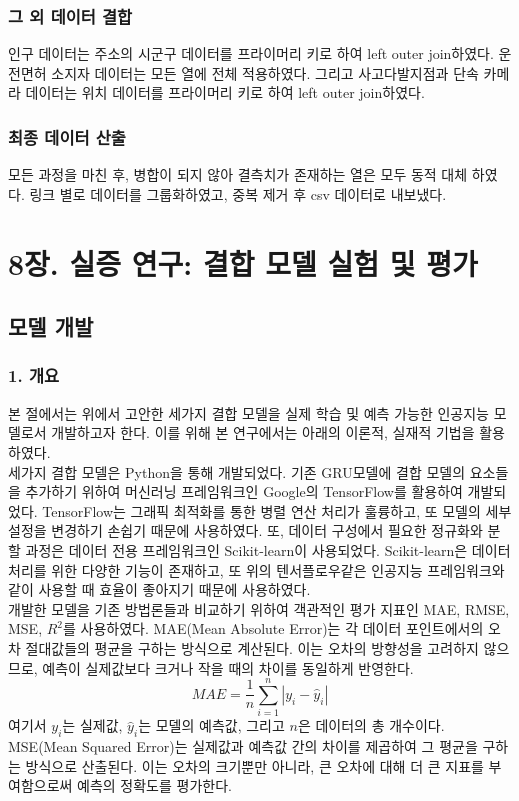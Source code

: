\documentclass[11pt]{report}
\begin{document}
\subsection{그 외 데이터 결합}
인구 데이터는 주소의 시군구 데이터를 프라이머리 키로 하여 left outer join하였다. 
운전면허 소지자 데이터는 모든 열에 전체 적용하였다. 
그리고 사고다발지점과 단속 카메라 데이터는 위치 데이터를 프라이머리 키로 하여 left outer join하였다. 

\subsection{최종 데이터 산출}
모든 과정을 마친 후, 병합이 되지 않아 결측치가 존재하는 열은 모두 동적 대체 하였다. 
링크 별로 데이터를 그룹화하였고, 중복 제거 후 csv 데이터로 내보냈다. 

\chapter*{8장. 실증 연구: 결합 모델 실험 및 평가}
\setcounter{chapter}{8}
\setcounter{section}{0}
\setcounter{subsection}{0}

\section{모델 개발}
\subsection*{1. 개요}
본 절에서는 위에서 고안한 세가지 결합 모델을 실제 학습 및 예측 가능한 인공지능 모델로서 개발하고자 한다. 
이를 위해 본 연구에서는 아래의 이론적, 실재적 기법을 활용하였다. \\
\indent 세가지 결합 모델은 Python을 통해 개발되었다. 
기존 GRU모델에 결합 모델의 요소들을 추가하기 위하여 머신러닝 프레임워크인 Google의 TensorFlow\texttrademark 를 활용하여 개발되었다. 
TensorFlow\texttrademark 는 그래픽 최적화를 통한 병렬 연산 처리가 훌륭하고, 또 모델의 세부설정을 변경하기 손쉽기 때문에 사용하였다. 
또, 데이터 구성에서 필요한 정규화와 분할 과정은 데이터 전용 프레임워크인 Scikit-learn이 사용되었다. 
Scikit-learn은 데이터 처리를 위한 다양한 기능이 존재하고, 또 위의 텐서플로우같은 인공지능 프레임워크와 같이 사용할 때 효율이 좋아지기 때문에 사용하였다. \\
\indent 개발한 모델을 기존 방법론들과 비교하기 위하여 객관적인 평가 지표인 MAE, RMSE, MSE, $R^2$를 사용하였다. 
MAE(Mean Absolute Error)는 각 데이터 포인트에서의 오차 절대값들의 평균을 구하는 방식으로 계산된다. 
이는 오차의 방향성을 고려하지 않으므로, 예측이 실제값보다 크거나 작을 때의 차이를 동일하게 반영한다. 
\[
MAE = \frac{1}{n} \sum_{i=1}^{n} |y_i - \hat{y}_i|
\]
여기서 \(y_i\)는 실제값, \(\hat{y}_i\)는 모델의 예측값, 그리고 \(n\)은 데이터의 총 개수이다. \\
\indent MSE(Mean Squared Error)는 실제값과 예측값 간의 차이를 제곱하여 그 평균을 구하는 방식으로 산출된다. 
이는 오차의 크기뿐만 아니라, 큰 오차에 대해 더 큰 지표를 부여함으로써 예측의 정확도를 평가한다.  
\end{document}
